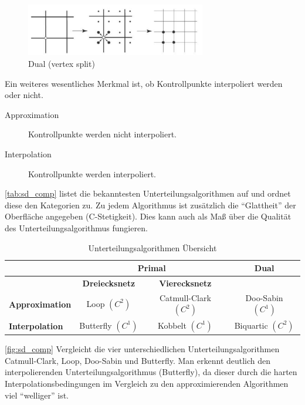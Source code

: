 \begin{figure}
  \centering
  \includegraphics[width=0.7\textwidth]{content/media/sd_dual}
  \caption{Dual (vertex split) \cite{Standford.24.07.2015}}
  \label{fig:sd_dual}
\end{figure}

Ein weiteres wesentliches Merkmal ist, ob Kontrollpunkte interpoliert werden oder nicht. 
\begin{description}
 \item[Approximation] Kontrollpunkte werden nicht interpoliert.
 \item[Interpolation] Kontrollpunkte werden interpoliert.
\end{description}

\autoref{tab:sd_comp} listet die bekanntesten Unterteilungsalgorithmen auf und ordnet diese den Kategorien zu.
Zu jedem Algorithmus ist zusätzlich die \enquote{Glattheit} der Oberfläche angegeben (C-Stetigkeit).
Dies kann auch als Maß über die Qualität des Unterteilungsalgorithmus fungieren.


\begin{table}
\center
\caption{Unterteilungsalgorithmen Übersicht}
\label{tab:sd_comp}
\begin{tabular}{l|c|c|c}
& \multicolumn{2}{c|}{\textbf{Primal}} & \textbf{Dual}\\
\hline
& \textbf{Dreiecksnetz} & \textbf{Vierecksnetz} & \\
\hline
\textbf{Approximation} & Loop \((C^2)\) & Catmull-Clark \((C^2)\) & Doo-Sabin \((C^1)\) \\
\textbf{Interpolation} & Butterfly \((C^1)\) & Kobbelt \((C^1)\) & Biquartic \((C^2)\) \\
\end{tabular}
\end{table}

\autoref{fig:sd_comp} Vergleicht die vier unterschiedlichen Unterteilungsalgorithmen Catmull-Clark, Loop, Doo-Sabin und Butterfly.
Man erkennt deutlich den interpolierenden Unterteilungsalgorithmus (Butterfly),
da dieser durch die harten Interpolationsbedingungen im Vergleich zu den approximierenden Algorithmen viel \enquote{welliger} ist.

